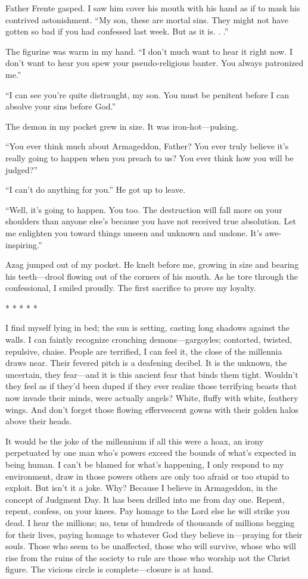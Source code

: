 Father Frente gasped. I saw him cover his mouth with his hand as if to
mask his contrived astonishment. ``My son, these are mortal sins. They
might not have gotten so bad if you had confessed last week. But as it
is. . .''

The figurine was warm in my hand. ``I don't much want to hear it right
now. I don't want to hear you spew your pseudo-religious banter. You
always patronized me.''

``I can see you're quite distraught, my son. You must be penitent before
I can absolve your sins before God.''

The demon in my pocket grew in size. It was iron-hot---pulsing.

``You ever think much about Armageddon, Father? You ever truly believe
it's really going to happen when you preach to us? You ever think how
you will be judged?''

``I can't do anything for you.'' He got up to leave.

``Well, it's going to happen. You too. The destruction will fall more on
your shoulders than anyone else's because you have not received true
absolution. Let me enlighten you toward things unseen and unknown and
undone. It's awe-inspiring.''

Azag jumped out of my pocket. He knelt before me, growing in size and
bearing his teeth---drool flowing out of the corners of his mouth. As he
tore through the confessional, I smiled proudly. The first sacrifice to
prove my loyalty.

* * * * *

I find myself lying in bed; the sun is setting, casting long shadows
against the walls. I can faintly recognize crouching demons---gargoyles;
contorted, twisted, repulsive, chaise. People are terrified, I can feel
it, the close of the millennia draws near. Their fevered pitch is a
deafening decibel. It is the unknown, the uncertain, they fear---and it
is this ancient fear that binds them tight. Wouldn't they feel as if
they'd been duped if they ever realize those terrifying beasts that now
invade their minds, were actually angels? White, fluffy with white,
feathery wings. And don't forget those flowing effervescent gowns with
their golden halos above their heads.

It would be the joke of the millennium if all this were a hoax, an irony
perpetuated by one man who's powers exceed the bounds of what's expected
in being human. I can't be blamed for what's happening, I only respond
to my environment, draw in those powers others are only too afraid or
too stupid to exploit. But isn't it a joke. Why? Because I believe in
Armageddon, in the concept of Judgment Day. It has been drilled into me
from day one. Repent, repent, confess, on your knees. Pay homage to the
Lord else he will strike you dead. I hear the millions; no, tens of
hundreds of thousands of millions begging for their lives, paying homage
to whatever God they believe in---praying for their souls. Those who
seem to be unaffected, those who will survive, whose who will rise from
the ruins of the society to rule are those who worship not the Christ
figure. The vicious circle is complete---closure is at hand.

